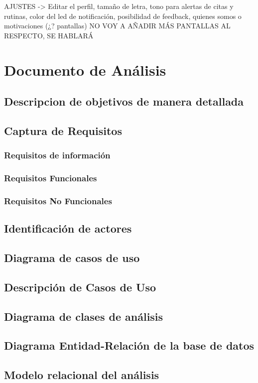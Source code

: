 \documentclass[../pfc.tex]{subfiles}
\begin{document}
	AJUSTES  ->  	Editar el perfil, 
	tamaño de letra, 	
	tono para alertas de citas y rutinas, 
	color del led de notificación, 
	posibilidad de feedback,
	quienes somos o motivaciones (¿? pantallas)
	NO VOY A AÑADIR MÁS PANTALLAS AL RESPECTO, SE HABLARÁ
	
	\section{Documento de Análisis}
	
		\subsection{Descripcion de objetivos de manera detallada}
	
		\subsection{Captura de Requisitos}
	
			\subsubsection{Requisitos de información}
	
			\subsubsection{Requisitos Funcionales}

			\subsubsection{Requisitos No Funcionales}
	
		\subsection{Identificación de actores}
		
		\subsection{Diagrama de casos de uso }
		
		\subsection{Descripción de Casos de Uso}
		
		\subsection{Diagrama de clases de análisis}
		
		\subsection{Diagrama Entidad-Relación de la base de datos}
		
		\subsection{Modelo relacional del análisis}
	
		

		
	
\end{document}
